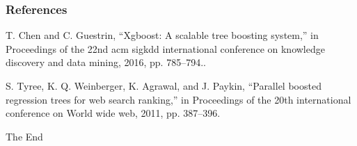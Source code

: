 \documentclass{beamer}
\begin{document}
\begin{frame}
\frametitle{References}
\footnotesize{
\begin{thebibliography}{99} %

T. Chen and C. Guestrin, “Xgboost: A scalable tree boosting system,” in Proceedings of the 22nd acm sigkdd international conference on knowledge discovery and data mining, 2016, pp. 785--794..

S. Tyree, K. Q. Weinberger, K. Agrawal, and J. Paykin, “Parallel boosted regression trees for web search ranking,” in Proceedings of the 20th international conference on World wide web, 2011, pp. 387--396.

\end{thebibliography}
}
\end{frame}




\begin{frame}
\Huge{\centerline{The End}}
\end{frame}

\end{document}
